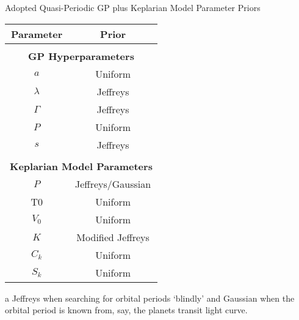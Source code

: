 \begin{threeparttable}
\caption{Adopted Quasi-Periodic GP plus Keplarian Model Parameter Priors}
\label{table:priors}
\begin{tabular}{cc}
  \hline
  \hline
  \textbf{Parameter} & \textbf{Prior} \\
  \hline
  & \\
  \multicolumn{2}{c}{\textbf{GP Hyperparameters}} \\
  \hline
  $a$ & Uniform \\
  $\lambda$ & Jeffreys \\
  $\Gamma$ & Jeffreys \\
  $P$ & Uniform \\
  $s$ & Jeffreys \\
  \hline
  & \\
  \multicolumn{2}{c}{\textbf{Keplarian Model Parameters}} \\
  \hline
  $P$ & Jeffreys/Gaussian\tnote{a} \\
  T0 & Uniform \\
  $V_0$ & Uniform \\
  $K$ & Modified Jeffreys \\
  $C_k$ & Uniform \\
  $S_k$ & Uniform \\
  \hline
  \end{tabular}
\begin{tablenotes}
\item[a] Jeffreys when searching for orbital periods `blindly' and 
Gaussian when the orbital period is known from, say, the planets 
transit light curve.
\end{tablenotes}
\end{threeparttable}
